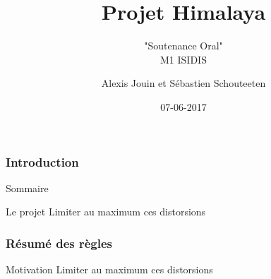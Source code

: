 \documentclass{beamer}
\begin{document}
	\title{Projet Himalaya}
	\subtitle{"Soutenance Oral"\\
		M1 ISIDIS}
	\author {Alexis Jouin et Sébastien Schouteeten}
	\date{07-06-2017}
	\frame[plain]{
		\titlepage
	}

	\begin{frame}
		\frametitle{Introduction}
		\begin{block}{Sommaire}
			\tableofcontents
		\end{block}
		\begin{block}{Le projet}
			Limiter au maximum ces distorsions
		\end{block}
	\end{frame}

	\begin{frame}
		\frametitle{Résumé des règles}
		\begin{block}{Motivation}
			Limiter au maximum ces distorsions
		\end{block}	
	\end{frame}

	
\end{document}

